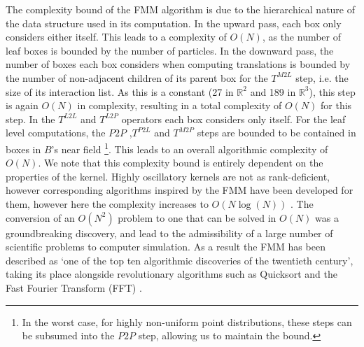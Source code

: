 The complexity bound of the FMM algorithm is due to the hierarchical nature of the data structure used in its computation. In the upward pass, each box only considers either itself. This leads to a complexity of $O(N)$, as the number of leaf boxes is bounded by the number of particles. In the downward pass, the number of boxes each box considers when computing translations is bounded by the number of non-adjacent children of its parent box for the $T^{M2L}$ step, i.e. the size of its interaction list. As this is a constant (27 in $\mathbb{R}^2$ and 189 in $\mathbb{R}^3$), this step is again $O(N)$ in complexity, resulting in a total complexity of $O(N)$ for this step. In the $T^{L2L}$ and $T^{L2P}$ operators each box considers only itself. For the leaf level computations, the $P2P$ ,$T^{P2L}$ and $T^{M2P}$ steps are bounded to be contained in boxes in $B$'s near field \footnote{In the worst case, for highly non-uniform point distributions, these steps can be subsumed into the $P2P$ step, allowing us to maintain the bound.}. This leads to an overall algorithmic complexity of $O(N)$. We note that this complexity bound is entirely dependent on the properties of the kernel. Highly oscillatory kernels are not as rank-deficient, however corresponding algorithms inspired by the FMM have been developed for them, however here the complexity increases to $O(N \log (N) )$ \cite{messner2012fast}. The conversion of an $O(N^2)$ problem to one that can be solved in $O(N)$ was a groundbreaking discovery, and lead to the admissibility of a large number of scientific problems to computer simulation. As a result the FMM has been described as `one of the top ten algorithmic discoveries of the twentieth century', taking its place alongside revolutionary algorithms such as Quicksort and the Fast Fourier Transform (FFT) \cite{cipra2000best}.